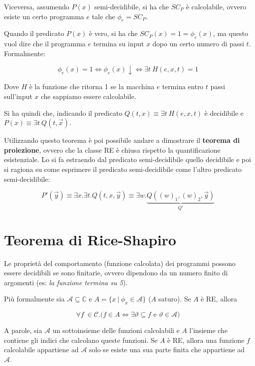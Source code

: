 Viceversa, assumendo $P(x)$ semi-decidibile, si ha che $SC_P$ è calcolabile, ovvero esiste un certo programma $e$ tale che $\phi_e = SC_P$.

Quando il predicato $P(x)$ è vero, si ha che $SC_P(x) = 1 = \phi_e(x)$, ma questo vuol dire che il programma $e$ termina su input $x$ dopo un certo numero di passi $t$. Formalmente:

$$
\phi_e(x) = 1 \Leftrightarrow \phi_e(x) \downarrow \Leftrightarrow \exists t \: H(e,x,t) = 1
$$

Dove $H$ è la funzione che ritorna 1 se la macchina $e$ termina entro $t$ passi sull'input $x$ che sappiamo essere calcolabile.

Si ha quindi che, indicando il predicato $Q(t,x) \equiv \exists t \: H(e,x,t)$ è decidibile e $P(x) \equiv \exists t \: Q(t,\vec{x})$.

Utilizzando questo teorema è poi possibile andare a dimostrare il \textbf{teorema di proiezione}, ovvero che la classe RE è chiusa rispetto la quantificazione esistenziale. Lo si fa estraendo dal predicato semi-decidibile quello decidibile e poi si ragiona su come esprimere il predicato semi-decidibile come l'altro predicato semi-decidibile:

 $$
 P'(\vec{y}) \equiv \exists x.\exists t . Q(t,x, \vec{y}) \equiv \exists w . \underbrace{Q((w)_1, (w)_2, \vec{y})}_{Q'}
 $$



\section{Teorema di Rice-Shapiro}

Le proprietà del comportamento (funzione calcolata) dei programmi possono essere decidibili se sono finitarie, ovvero dipendono da un numero finito di argomenti (es: \textit{la funzione termina su 5}).

Più formalmente sia $\mathcal{A}\subseteq \mathbb{C}$ e $A = \{x \: | \: \phi_x \in \mathcal{A} \}$ ($A$ saturo). Se $A$ è RE, allora

$$
\forall f \: \in \mathcal{C} . \bigg( f \in A \Leftrightarrow \exists \vartheta \subseteq f \text{ e } \vartheta \in \mathcal{A}  \bigg)
$$

A parole, sia $\mathcal{A}$ un sottoinsieme delle funzioni calcolabili e $A$ l'insieme che contiene gli indici che calcolano queste funzioni. Se $A$ è RE, allora una funzione $f$ calcolabile appartiene ad $\mathcal{A}$ solo se esiste una sua parte finita che appartiene ad $\mathcal{A}$.

